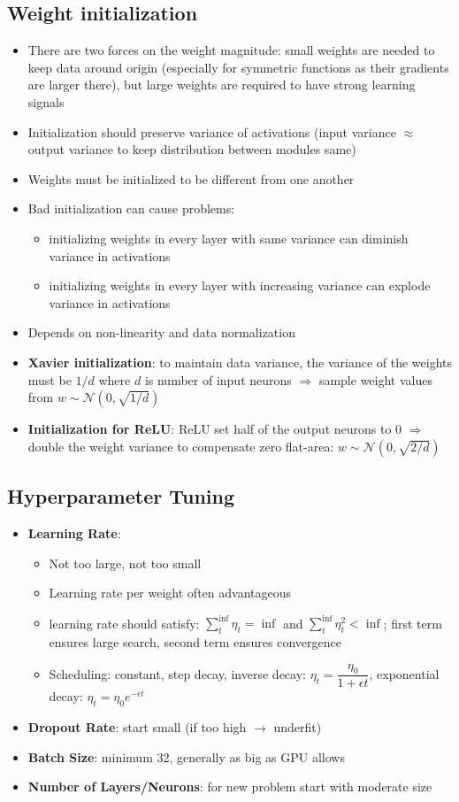 \subsection{Weight initialization}
\begin{itemize}
	\item There are two forces on the weight magnitude: small weights are needed to keep data around origin (especially for symmetric functions as their gradients are larger there), but large weights are required to have strong learning signals
	\item Initialization should preserve variance of activations (input variance $\approx$ output variance to keep distribution between modules same)
	\item Weights must be initialized to be different from one another
	\item Bad initialization can cause problems:
	\begin{itemize}
		\item initializing weights in every layer with same variance can diminish variance in activations
		\item initializing weights in every layer with increasing variance can explode variance in activations
	\end{itemize}
	\item Depends on non-linearity and data normalization
	\item \textbf{Xavier initialization}: to maintain data variance, the variance of the weights must be $1/d$ where $d$ is number of input neurons $\Rightarrow$ sample weight values from $w\sim\mathcal{N}(0,\sqrt{1/d})$
	\item \textbf{Initialization for ReLU}: ReLU set half of the output neurons to 0 $\Rightarrow$ double the weight variance to compensate zero flat-area: $w\sim\mathcal{N}(0,\sqrt{2/d})$
\end{itemize}
\subsection{Hyperparameter Tuning}
\begin{itemize}
	\item \textbf{Learning Rate}: 
	\begin{itemize}
		\item Not too large, not too small
		\item Learning rate per weight often advantageous
		\item learning rate should satisfy: $\sum_{t}^{\inf} \eta_t = \inf$ and $\sum_{t}^{\inf} \eta_t^2 < \inf$; first term ensures large search, second term ensures convergence
		\item Scheduling: constant, step decay, inverse decay: $\eta_t = \dfrac{\eta_0}{1+ \epsilon t}$, exponential decay: $\eta_t = \eta_0 e^{-\epsilon t}$
	\end{itemize}
	\item \textbf{Dropout Rate}: start small (if too high $\rightarrow$ underfit)
	\item \textbf{Batch Size}: minimum 32, generally as big as GPU allows
	\item \textbf{Number of Layers/Neurons}: for new problem start with moderate size
\end{itemize}